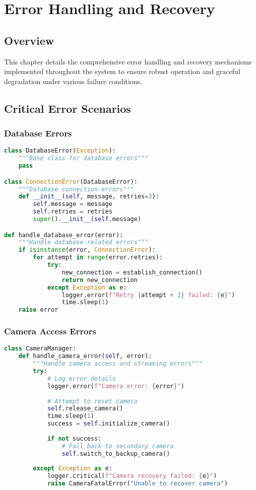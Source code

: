 \chapter{Error Handling and Recovery}

\section{Overview}
This chapter details the comprehensive error handling and recovery mechanisms implemented throughout the system to ensure robust operation and graceful degradation under various failure conditions.

\section{Critical Error Scenarios}

\subsection{Database Errors}
\begin{lstlisting}[language=Python]
class DatabaseError(Exception):
    """Base class for database errors"""
    pass

class ConnectionError(DatabaseError):
    """Database connection errors"""
    def __init__(self, message, retries=3):
        self.message = message
        self.retries = retries
        super().__init__(self.message)

def handle_database_error(error):
    """Handle database-related errors"""
    if isinstance(error, ConnectionError):
        for attempt in range(error.retries):
            try:
                new_connection = establish_connection()
                return new_connection
            except Exception as e:
                logger.error(f"Retry {attempt + 1} failed: {e}")
                time.sleep(1)
    raise error
\end{lstlisting}

\subsection{Camera Access Errors}
\begin{lstlisting}[language=Python]
class CameraManager:
    def handle_camera_error(self, error):
        """Handle camera access and streaming errors"""
        try:
            # Log error details
            logger.error(f"Camera error: {error}")
            
            # Attempt to reset camera
            self.release_camera()
            time.sleep(1)
            success = self.initialize_camera()
            
            if not success:
                # Fall back to secondary camera
                self.switch_to_backup_camera()
                
        except Exception as e:
            logger.critical(f"Camera recovery failed: {e}")
            raise CameraFatalError("Unable to recover camera")
\end{lstlisting}

